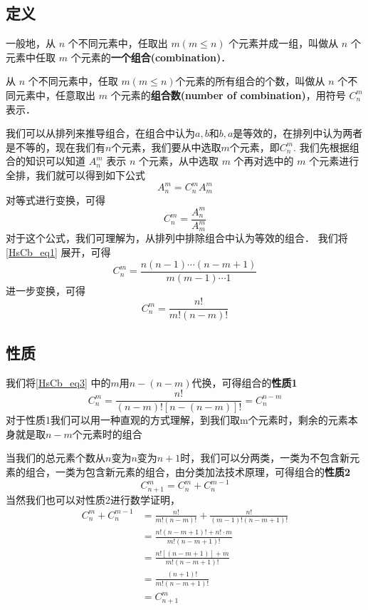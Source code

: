 

\subsection{定义}
一般地，从 $n$ 个不同元素中，任取出 $m(m\leq n)$ 个元素并成一组，叫做从 $n$ 个元素中任取 $m$ 个元素的\textbf{一个组合(combination)}．

从 $n$ 个不同元素中，任取 $m(m\leq n)$个元素的所有组合的个数，叫做从 $n$ 个不同元素中，任意取出 $m$ 个元素的\textbf{组合数(number of combination)}，用符号 $C_n^m$ 表示．

我们可以从排列来推导组合，在组合中认为${a,b}$和${b,a}$是等效的，在排列中认为两者是不等的，现在我们有$n$个元素，我们要从中选取$m$个元素，即$C_n^m$.
我们先根据组合的知识可以知道 $A_n^m$ 表示 $n$ 个元素，从中选取 $m$ 个再对选中的 $m$ 个元素进行全排，我们就可以得到如下公式
\begin{equation}
A_n^m = C_n^m A_m^m
\end{equation}
对等式进行变换，可得
\begin{equation}\label{HsCb_eq1}
C_n^m = \frac {A_n^m}{A_m^m}
\end{equation}
对于这个公式，我们可理解为，从排列中排除组合中认为等效的组合．
我们将\autoref{HsCb_eq1} 展开，可得
\begin{equation}\label{HsCb_eq2} 
C_n^m = \frac{n(n -1) \cdots(n -m + 1)}{m(m-1)\cdots 1}
\end{equation}
进一步变换，可得
\begin{equation}\label{HsCb_eq3}
C_n^m = \frac{n!}{m!(n-m)!}
\end{equation}

\subsection{性质}

我们将\autoref{HsCb_eq3} 中的$m$用$n-(n-m) $代换，可得组合的\textbf{性质1}
\begin{equation}
C_n^m = \frac{n!}{(n -m)![n-(n-m)]!} = C_n^{n-m}
\end{equation}
对于性质1我们可以用一种直观的方式理解，到我们取m个元素时，剩余的元素本身就是取$n-m$个元素时的组合

当我们的总元素个数从$n$变为$n$变为$n+1$时，我们可以分两类，一类为不包含新元素的组合，一类为包含新元素的组合，由分类加法技术原理，可得组合的\textbf{性质2}
\begin{equation}
C_{n + 1}^m = C_n^m + C_n^{m -1}
\end{equation}
当然我们也可以对性质2进行数学证明，
\begin{equation}
\begin{aligned}
C_n^m + C_n^{m - 1} &= \frac{n!}{m!(n-m)!} + \frac{n!}{(m - 1)!(n - m + 1)!}\\
&= \frac{n!(n - m + 1)! + n!\cdot m}{m!(n - m + 1)!}\\
&= \frac{n![(n - m + 1)] + m}{m!(n - m + 1)!}\\
&= \frac{(n + 1)!}{m!(n - m + 1)!}\\
&= C_{n + 1}^m
\end{aligned}
\end{equation}

